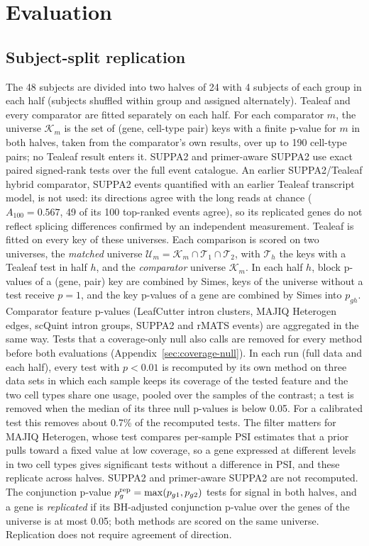 \documentclass[11pt]{article}
\begin{document}
\section{Evaluation}
\label{sec:evaluation}

\subsection{Subject-split replication}

The 48 subjects are divided into two halves of 24 with 4 subjects of each group in each half (subjects shuffled within group and assigned alternately). Tealeaf and every comparator are fitted separately on each half. For each comparator $m$, the universe $\mathcal K_m$ is the set of (gene, cell-type pair) keys with a finite p-value for $m$ in both halves, taken from the comparator's own results, over up to 190 cell-type pairs; no Tealeaf result enters it. SUPPA2 and primer-aware SUPPA2 use exact paired signed-rank tests over the full event catalogue. An earlier SUPPA2/Tealeaf hybrid comparator, SUPPA2 events quantified with an earlier Tealeaf transcript model, is not used: its directions agree with the long reads at chance ($A_{100}=0.567$, 49 of its 100 top-ranked events agree), so its replicated genes do not reflect splicing differences confirmed by an independent measurement. Tealeaf is fitted on every key of these universes. Each comparison is scored on two universes, the \emph{matched} universe $\mathcal U_m=\mathcal K_m\cap\mathcal T_1\cap\mathcal T_2$, with $\mathcal T_h$ the keys with a Tealeaf test in half $h$, and the \emph{comparator} universe $\mathcal K_m$. In each half $h$, block p-values of a (gene, pair) key are combined by Simes, keys of the universe without a test receive $p=1$, and the key p-values of a gene are combined by Simes into $p_{gh}$. Comparator feature p-values (LeafCutter intron clusters, MAJIQ Heterogen edges, scQuint intron groups, SUPPA2 and rMATS events) are aggregated in the same way. Tests that a coverage-only null also calls are removed for every method before both evaluations (Appendix~\ref{sec:coverage-null}). In each run (full data and each half), every test with $p<0.01$ is recomputed by its own method on three data sets in which each sample keeps its coverage of the tested feature and the two cell types share one usage, pooled over the samples of the contrast; a test is removed when the median of its three null p-values is below 0.05. For a calibrated test this removes about 0.7\% of the recomputed tests. The filter matters for MAJIQ Heterogen, whose test compares per-sample PSI estimates that a prior pulls toward a fixed value at low coverage, so a gene expressed at different levels in two cell types gives significant tests without a difference in PSI, and these replicate across halves. SUPPA2 and primer-aware SUPPA2 are not recomputed. The conjunction p-value $p_g^{\rm rep}=\max(p_{g1},p_{g2})$ tests for signal in both halves, and a gene is \emph{replicated} if its BH-adjusted conjunction p-value over the genes of the universe is at most 0.05; both methods are scored on the same universe. Replication does not require agreement of direction.
\end{document}
